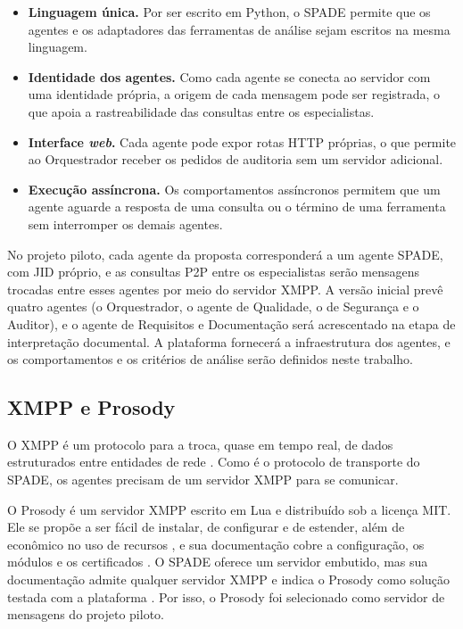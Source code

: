 \begin{itemize}
\item \textbf{Linguagem única.} Por ser escrito em Python, o SPADE permite que os agentes e os adaptadores das ferramentas de análise sejam escritos na mesma linguagem.
\item \textbf{Identidade dos agentes.} Como cada agente se conecta ao servidor com uma identidade própria, a origem de cada mensagem pode ser registrada, o que apoia a rastreabilidade das consultas entre os especialistas.
\item \textbf{Interface \textit{web}.} Cada agente pode expor rotas HTTP próprias, o que permite ao Orquestrador receber os pedidos de auditoria sem um servidor adicional.
\item \textbf{Execução assíncrona.} Os comportamentos assíncronos permitem que um agente aguarde a resposta de uma consulta ou o término de uma ferramenta sem interromper os demais agentes.
\end{itemize}

No projeto piloto, cada agente da proposta corresponderá a um agente SPADE, com JID próprio, e as consultas P2P entre os especialistas serão mensagens trocadas entre esses agentes por meio do servidor XMPP. A versão inicial prevê quatro agentes (o Orquestrador, o agente de Qualidade, o de Segurança e o Auditor), e o agente de Requisitos e Documentação será acrescentado na etapa de interpretação documental. A plataforma fornecerá a infraestrutura dos agentes, e os comportamentos e os critérios de análise serão definidos neste trabalho.

\subsection{XMPP e Prosody}
\label{st-xmpp}

O XMPP é um protocolo para a troca, quase em tempo real, de dados estruturados entre entidades de rede \cite{rfc6120}. Como é o protocolo de transporte do SPADE, os agentes precisam de um servidor XMPP para se comunicar.

O Prosody é um servidor XMPP escrito em Lua e distribuído sob a licença MIT. Ele se propõe a ser fácil de instalar, de configurar e de estender, além de econômico no uso de recursos \cite{prosodyHome}, e sua documentação cobre a configuração, os módulos e os certificados \cite{prosodyDocs}. O SPADE oferece um servidor embutido, mas sua documentação admite qualquer servidor XMPP e indica o Prosody como solução testada com a plataforma \cite{spadeUsage}. Por isso, o Prosody foi selecionado como servidor de mensagens do projeto piloto.

